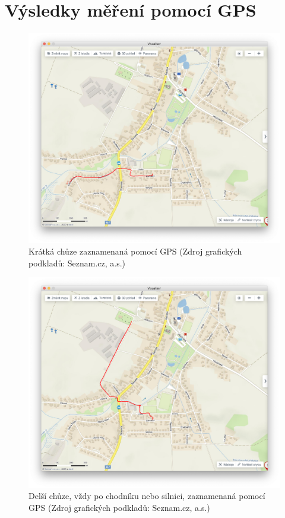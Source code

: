\documentclass[czech, bachelor]{diploma}
\begin{document}
\appendix

\chapter{Výsledky měření pomocí GPS} \label{gps-measuring-results-all}

\begin{figure}
    \centering
    \includegraphics[width=1\textwidth]{Figures/domzolsiny.png}
    \caption{Krátká chůze zaznamenaná pomocí GPS (Zdroj grafických podkladů: Seznam.cz, a.s.)}
    \label{fig:domzolsiny-fullsize}
\end{figure}

\begin{figure}
    \centering
    \includegraphics[width=1\textwidth]{Figures/hrbitov.png}
    \caption{Delší chůze, vždy po chodníku nebo silnici, zaznamenaná pomocí GPS (Zdroj grafických podkladů: Seznam.cz, a.s.)}
    \label{fig:hrbitov-fullsize}
\end{figure}
\end{document}

